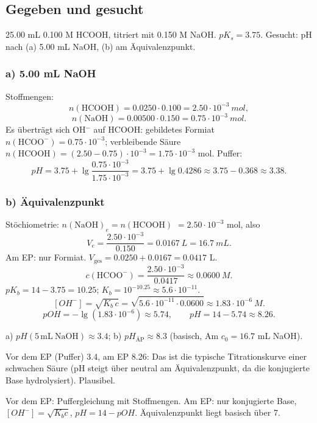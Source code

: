 
\subsection*{Gegeben und gesucht}
25.00 mL 0.100 M HCOOH, titriert mit 0.150 M NaOH. $pK_s=3.75$.
Gesucht: pH nach (a) 5.00 mL NaOH, (b) am Äquivalenzpunkt.

\subsubsection*{a) 5.00 mL NaOH}
Stoffmengen:
\[
  n(\mathrm{HCOOH})=0.0250\cdot0.100=2.50\cdot10^{-3}\ mol,
\]
\[
  n(\mathrm{NaOH})=0.00500\cdot0.150=0.75\cdot10^{-3}\ mol .
\]
Es überträgt sich OH$^-$ auf HCOOH: gebildetes Formiat
$n(\mathrm{HCOO^-})=0.75\cdot10^{-3}$; verbleibende Säure
$n(\mathrm{HCOOH})=(2.50-0.75)\cdot10^{-3}=1.75\cdot10^{-3}$ mol.
Puffer:
\[
  pH = 3.75 + \lg\frac{0.75\cdot10^{-3}}{1.75\cdot10^{-3}}
     = 3.75 + \lg 0.4286 \approx 3.75-0.368 \approx 3.38 .
\]

\subsubsection*{b) Äquivalenzpunkt}
Stöchiometrie: $n(\mathrm{NaOH})_e = n(\mathrm{HCOOH})$
$=2.50\cdot10^{-3}$ mol, also
\[
  V_e = \frac{2.50\cdot10^{-3}}{0.150} = 0.0167\ L = 16.7\ mL .
\]
Am EP: nur Formiat. $V_{\text{ges}}=0.0250+0.0167=0.0417$ L.
\[
  c(\mathrm{HCOO^-}) = \frac{2.50\cdot10^{-3}}{0.0417} \approx 0.0600\ M.
\]
$pK_b = 14-3.75 = 10.25$; $K_b=10^{-10.25}\approx5.6\cdot10^{-11}$.
\[
  [OH^-] = \sqrt{K_b\,c} = \sqrt{5.6\cdot10^{-11}\cdot0.0600}
    \approx 1.83\cdot10^{-6}\ M.
\]
\[
  pOH = -\lg(1.83\cdot10^{-6}) \approx 5.74,\qquad
  pH = 14-5.74 \approx 8.26 .
\]

\begin{ergebnis}
a) $pH(5\,\mathrm{mL\ NaOH}) \approx 3.4$;
b) $pH_{\text{ÄP}} \approx 8.3$ (basisch, Am $c_0{=}16.7$ mL NaOH).
\end{ergebnis}

\begin{kontrolle}
Vor dem EP (Puffer) 3.4, am EP 8.26: Das ist die typische Titrationskurve
einer schwachen Säure (pH steigt über neutral am Äquivalenzpunkt, da die
konjugierte Base hydrolysiert). Plausibel.
\end{kontrolle}

\begin{merksatz}
Vor dem EP: Puffergleichung mit Stoffmengen. Am EP: nur konjugierte Base,
$[OH^-]=\sqrt{K_b c}$, $pH=14-pOH$. Äquivalenzpunkt liegt basisch über 7.
\end{merksatz}
